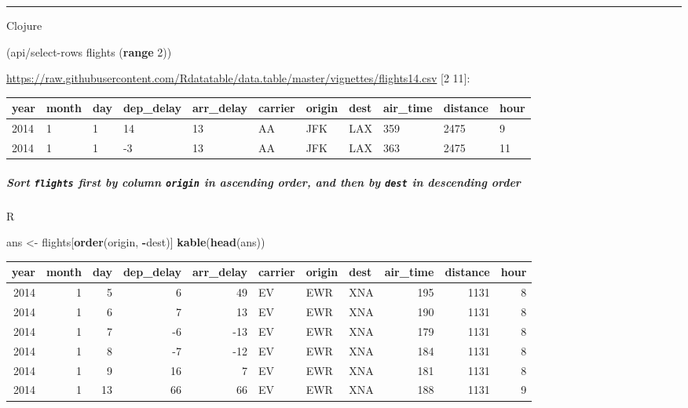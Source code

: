 \documentclass[]{article}
\newenvironment{Shaded}{\begin{snugshade}}{\end{snugshade}}
\newcommand{\KeywordTok}[1]{\textcolor[rgb]{0.13,0.29,0.53}{\textbf{#1}}}
\newcommand{\DecValTok}[1]{\textcolor[rgb]{0.00,0.00,0.81}{#1}}
\newcommand{\StringTok}[1]{\textcolor[rgb]{0.31,0.60,0.02}{#1}}
\newcommand{\OperatorTok}[1]{\textcolor[rgb]{0.81,0.36,0.00}{\textbf{#1}}}
\newcommand{\NormalTok}[1]{#1}
\let\oldsubparagraph\subparagraph
\renewcommand{\subparagraph}[1]{\oldsubparagraph{#1}\mbox{}}
\begin{document}
\begin{center}\rule{0.5\linewidth}{0.5pt}\end{center}

Clojure

\begin{Shaded}
\begin{Highlighting}[]
\NormalTok{(api/select-rows flights (}\KeywordTok{range} \DecValTok{2}\NormalTok{))}
\end{Highlighting}
\end{Shaded}

\url{https://raw.githubusercontent.com/Rdatatable/data.table/master/vignettes/flights14.csv}
{[}2 11{]}:

\begin{longtable}[]{@{}lllllllllll@{}}
\toprule
year & month & day & dep\_delay & arr\_delay & carrier & origin & dest &
air\_time & distance & hour\tabularnewline
\midrule
\endhead
2014 & 1 & 1 & 14 & 13 & AA & JFK & LAX & 359 & 2475 & 9\tabularnewline
2014 & 1 & 1 & -3 & 13 & AA & JFK & LAX & 363 & 2475 & 11\tabularnewline
\bottomrule
\end{longtable}

\subparagraph{\texorpdfstring{Sort \texttt{flights} first by column
\texttt{origin} in ascending order, and then by \texttt{dest} in
descending
order}{Sort flights first by column origin in ascending order, and then by dest in descending order}}\label{sort-flights-first-by-column-origin-in-ascending-order-and-then-by-dest-in-descending-order}

R

\begin{Shaded}
\begin{Highlighting}[]
\NormalTok{ans <-}\StringTok{ }\NormalTok{flights[}\KeywordTok{order}\NormalTok{(origin, }\OperatorTok{-}\NormalTok{dest)]}
\KeywordTok{kable}\NormalTok{(}\KeywordTok{head}\NormalTok{(ans))}
\end{Highlighting}
\end{Shaded}

\begin{longtable}[]{@{}rrrrrlllrrr@{}}
\toprule
year & month & day & dep\_delay & arr\_delay & carrier & origin & dest &
air\_time & distance & hour\tabularnewline
\midrule
\endhead
2014 & 1 & 5 & 6 & 49 & EV & EWR & XNA & 195 & 1131 & 8\tabularnewline
2014 & 1 & 6 & 7 & 13 & EV & EWR & XNA & 190 & 1131 & 8\tabularnewline
2014 & 1 & 7 & -6 & -13 & EV & EWR & XNA & 179 & 1131 & 8\tabularnewline
2014 & 1 & 8 & -7 & -12 & EV & EWR & XNA & 184 & 1131 & 8\tabularnewline
2014 & 1 & 9 & 16 & 7 & EV & EWR & XNA & 181 & 1131 & 8\tabularnewline
2014 & 1 & 13 & 66 & 66 & EV & EWR & XNA & 188 & 1131 & 9\tabularnewline
\bottomrule
\end{longtable}
\end{document}
